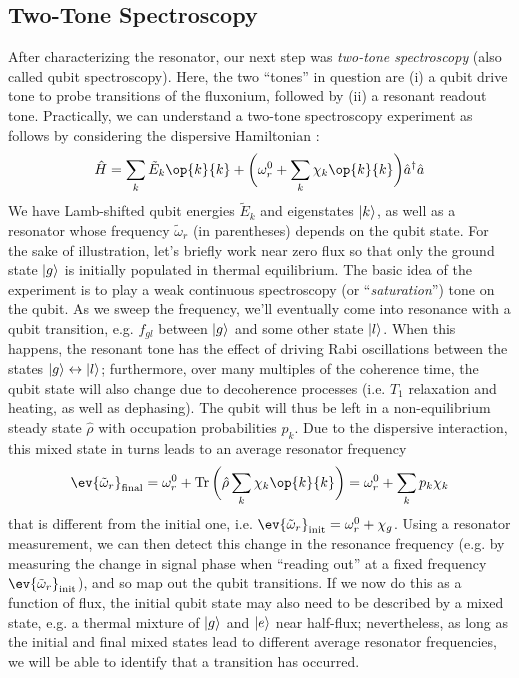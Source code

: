 \newpage
\subsection{Two-Tone Spectroscopy}
After characterizing the resonator, our next step was \textit{two-tone spectroscopy} (also called qubit spectroscopy). Here, the two ``tones'' in question are (i) a qubit drive tone to probe transitions of the fluxonium, followed by (ii) a resonant readout tone. Practically, we can understand a two-tone spectroscopy experiment as follows by considering the dispersive Hamiltonian \cite{zhu2013cQEDfluxonium}:
\begin{equation}
    \hat{H} = \sum_k \tilde{E}_k \op{k}{k} + \bigg(\omega_r^0 + \sum_k \chi_k \op{k}{k}\bigg) \hat{a}^\dagger\hat{a}
\end{equation}
We have Lamb-shifted qubit energies $\tilde{E}_k$ and eigenstates $\lvert k\rangle$, as well as a resonator whose frequency $\tilde{\omega}_r$ (in parentheses) depends on the qubit state. For the sake of illustration, let's briefly work near zero flux so that only the ground state $\lvert g\rangle$ is initially populated in thermal equilibrium. The basic idea of the experiment is to play a weak continuous spectroscopy (or ``\textit{saturation}'') tone on the qubit. As we sweep the frequency, we'll eventually come into resonance with a qubit transition, e.g. $f_{gl}$ between $\lvert g\rangle$ and some other state $\lvert l\rangle$. When this happens, the resonant tone has the effect of driving Rabi oscillations between the states $\lvert g\rangle \leftrightarrow \lvert l\rangle$; furthermore, over many multiples of the coherence time, the qubit state will also change due to decoherence processes (i.e. $T_1$ relaxation and heating, as well as dephasing). The qubit will thus be left in a non-equilibrium steady state $\hat{\rho}$ with occupation probabilities $p_k$. Due to the dispersive interaction, this mixed state in turns leads to an average resonator frequency
\begin{equation}
    \ev{\tilde{\omega}_r}_{\rm final} = \omega_r^0 + \Tr\bigg(\hat{\rho} \sum_k \chi_k \op{k}{k}\bigg) = \omega_r^0 + \sum_k p_k \chi_k
\end{equation}
that is different from the initial one, i.e. $\ev{\tilde{\omega}_r}_{\rm init} = \omega_r^0 + \chi_g$. Using a resonator measurement, we can then detect this change in the resonance frequency (e.g. by measuring the change in signal phase when ``reading out'' at a fixed frequency $\ev{\tilde{\omega}_r}_{\rm init}$), and so map out the qubit transitions. If we now do this as a function of flux, the initial qubit state may also need to be described by a mixed state, e.g. a thermal mixture of $\lvert g\rangle$ and $\lvert e\rangle$ near half-flux; nevertheless, as long as the initial and final mixed states lead to different average resonator frequencies, we will be able to identify that a transition has occurred. 

